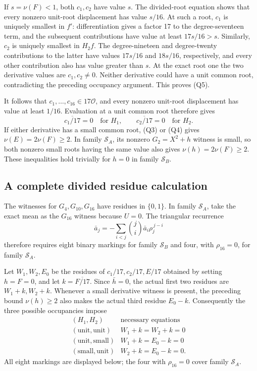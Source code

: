 \documentclass[
  british,
  10pt,
  a4paper,
]{article}
\begin{document}
If \(s=\nu(F)<1\), both \(c_1,c_2\) have value \(s\). The divided-root
equation shows that every nonzero unit-root displacement has value
\(s/16\). At such a root, \(c_1\) is uniquely smallest in \(f'\):
differentiation gives a factor 17 to the degree-seventeen term, and the
subsequent contributions have value at least \(17s/16>s\). Similarly,
\(c_2\) is uniquely smallest in \(H_2f\). The degree-nineteen and
degree-twenty contributions to the latter have values \(17s/16\) and
\(18s/16\), respectively, and every other contribution also has value
greater than \(s\). At the exact root one the two derivative values are
\(c_1,c_2\ne0\). Neither derivative could have a unit common root,
contradicting the preceding occupancy argument. This proves (Q5).

It follows that \(c_1,\ldots,c_{16}\in17\mathcal O\), and every nonzero
unit-root displacement has value at least \(1/16\). Evaluation at a unit
common root therefore gives \[
\overline{c_1/17}=0\quad\text{for }H_1,\qquad
\overline{c_2/17}=0\quad\text{for }H_2. \tag{Q7}
\] If either derivative has a small common root, (Q3) or (Q4) gives
\(\nu(E)=2\nu(F)\geq2\). In family \(\mathcal S_A\), its nonzero
\(G_2=X^2+h\) witness is small, so both nonzero small roots having the
same value also gives \(\nu(h)=2\nu(F)\geq2\). These inequalities hold
trivially for \(h=0\) in family \(\mathcal S_B\).

\subsection{A complete divided residue
calculation}\label{a-complete-divided-residue-calculation}

The witnesses for \(G_4,G_{10},G_{16}\) have residues in \(\{0,1\}\). In
family \(\mathcal S_A\), take the exact mean as the \(G_{16}\) witness
because \(U=0\). The triangular recurrence \[
\bar a_j=-\sum_{i<j}\binom ji\bar a_i\rho_j^{\,j-i}
\] therefore requires eight binary markings for family \(\mathcal S_B\)
and four, with \(\rho_{16}=0\), for family \(\mathcal S_A\).

Let \(W_1,W_2,E_0\) be the residues of \(c_1/17,c_2/17,E/17\) obtained
by setting \(h=F=0\), and let \(k=\overline{F/17}\). Since \(\bar h=0\),
the actual first two residues are \(W_1+k,W_2+k\). Whenever a small
derivative witness is present, the preceding bound \(\nu(h)\geq2\) also
makes the actual third residue \(E_0-k\). Consequently the three
possible occupancies impose \[
\begin{array}{c|c}
(H_1,H_2)&\text{necessary equations}\\ \hline
(\mathrm{unit},\mathrm{unit})&W_1+k=W_2+k=0\\
(\mathrm{unit},\mathrm{small})&W_1+k=E_0-k=0\\
(\mathrm{small},\mathrm{unit})&W_2+k=E_0-k=0.
\end{array} \tag{Q8}
\] All eight markings are displayed below; the four with \(\rho_{16}=0\)
cover family \(\mathcal S_A\).
\end{document}
